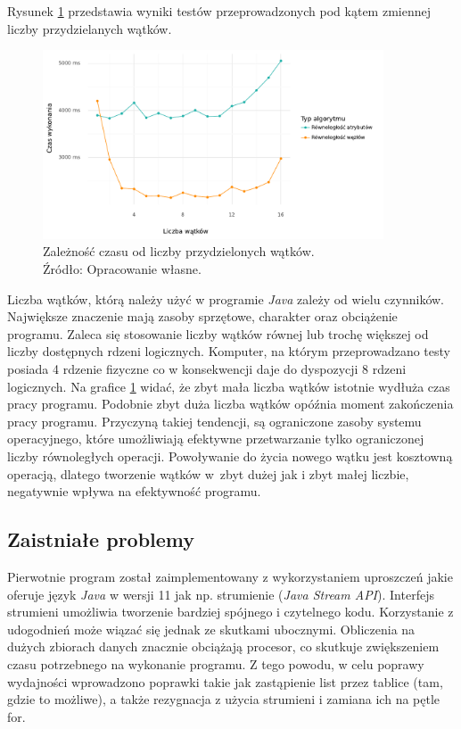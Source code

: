 \documentclass[12pt]{article}
\begin{document}
Rysunek \ref{fig:analysis-threads} przedstawia wyniki testów przeprowadzonych pod kątem zmiennej
liczby przydzielanych wątków.

\begin{figure}[H]
    \centering
	\includegraphics[width=0.9\textwidth]{analysis-threads.pdf}
    \caption{Zależność czasu od liczby przydzielonych wątków.\\Źródło: Opracowanie własne.}
    \label{fig:analysis-threads}
\end{figure}

Liczba wątków, którą należy użyć w programie \textit{Java} zależy od wielu czynników. Największe znaczenie
mają zasoby sprzętowe, charakter oraz obciążenie programu.
Zaleca się stosowanie liczby wątków równej lub trochę większej od liczby dostępnych rdzeni logicznych.
Komputer, na którym przeprowadzano testy posiada 4 rdzenie fizyczne co w konsekwencji daje do
dyspozycji 8 rdzeni logicznych. Na grafice \ref{fig:analysis-threads} widać, że
zbyt mała liczba wątków istotnie wydłuża czas pracy programu.
Podobnie zbyt duża liczba wątków opóźnia moment zakończenia pracy programu. Przyczyną takiej tendencji, 
są ograniczone zasoby systemu operacyjnego, które umożliwiają
efektywne przetwarzanie tylko ograniczonej liczby równoległych operacji. Powoływanie do życia nowego wątku
jest kosztowną operacją, dlatego tworzenie wątków w~zbyt dużej jak i zbyt małej liczbie, negatywnie wpływa
na efektywność programu.

\subsection{Zaistniałe problemy}
Pierwotnie program został zaimplementowany z wykorzystaniem uproszczeń jakie oferuje język \textit{Java} w wersji 11
jak np. strumienie (\textit{Java Stream API}). Interfejs strumieni umożliwia tworzenie
bardziej spójnego i czytelnego kodu. Korzystanie z udogodnień może wiązać się jednak ze skutkami ubocznymi.
Obliczenia na dużych zbiorach danych znacznie obciążają procesor, co skutkuje zwiększeniem czasu
potrzebnego na wykonanie programu. Z tego powodu, w celu poprawy wydajności wprowadzono poprawki
takie jak zastąpienie list przez tablice (tam, gdzie to możliwe), a także rezygnacja
z użycia strumieni i zamiana ich na pętle for.
\end{document}
